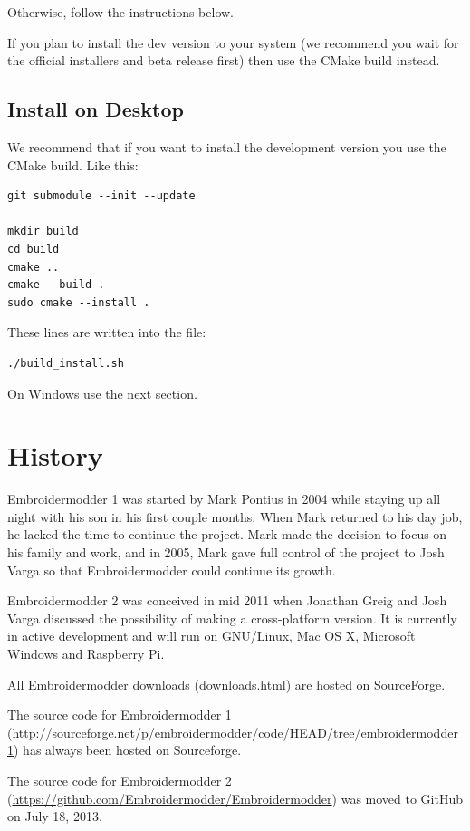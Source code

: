 \documentclass[a4paper]{report}
\begin{document}
Otherwise, follow the instructions below.

If you plan to install the dev version to your system (we recommend you wait
for the official installers and beta release first) then use the CMake build
instead.

\subsection{Install on Desktop}

We recommend that if you want to install the development version you use the CMake build. Like
this:

\begin{lstlisting}
git submodule --init --update

mkdir build
cd build
cmake ..
cmake --build .
sudo cmake --install .
\end{lstlisting}

These lines are written into the file:

\begin{lstlisting}
./build_install.sh
\end{lstlisting}

On Windows use the next section.

\section{History}

Embroidermodder 1 was started by Mark Pontius in 2004 while staying up all night
with his son in his first couple months. When Mark returned to his day job, he
lacked the time to continue the project. Mark made the decision to focus on his
family and work, and in 2005, Mark gave full control of the project to Josh
Varga so that Embroidermodder could continue its growth.

Embroidermodder 2 was conceived in mid 2011 when Jonathan Greig and Josh Varga
discussed the possibility of making a cross-platform version. It is currently in
active development and will run on GNU/Linux, Mac OS X, Microsoft Windows and
Raspberry Pi.

All Embroidermodder downloads (downloads.html) are hosted on SourceForge.

The source code for Embroidermodder 1
(\url{http://sourceforge.net/p/embroidermodder/code/HEAD/tree/embroidermodder1})
has always been hosted on Sourceforge.

The source code for Embroidermodder 2
(\url{https://github.com/Embroidermodder/Embroidermodder}) was moved to GitHub
on July 18, 2013.
\end{document}
